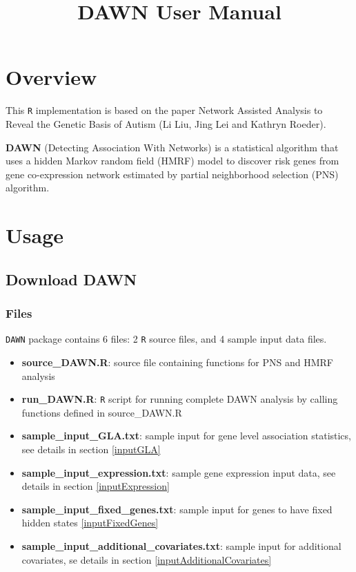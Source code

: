 \documentclass{article}
\title{ \vspace{-5mm}
        \textbf{DAWN User Manual}}
\date{}
\begin{document}
\maketitle 

\tableofcontents

\newpage
\section{Overview}
This \texttt{R} implementation is based on the paper Network Assisted Analysis to Reveal the Genetic Basis of Autism (Li Liu, Jing Lei and Kathryn Roeder)\cite{liu2015}.

\textbf{DAWN} (Detecting Association With Networks) is a statistical algorithm that uses a hidden Markov random field (HMRF) model to discover risk genes from gene co-expression network estimated by partial neighborhood selection (PNS) algorithm.


\section{Usage}
	\subsection{Download DAWN}
		\subsubsection{Files}
		\texttt{DAWN} package contains 6 files: 2 \texttt{R} source files, and 4 sample input data files.
		\begin{itemize}
			\item \textbf{source\_DAWN.R}: source file containing functions for PNS and HMRF analysis
			
			\item \textbf{run\_DAWN.R}: \texttt{R} script for running complete DAWN analysis by calling functions defined in {source\_DAWN.R}
			
			\item \textbf{sample\_input\_GLA.txt}: sample input for gene level association statistics, see details in section \ref{inputGLA}
			
			\item \textbf{sample\_input\_expression.txt}: sample gene expression input data, see details in section \ref{inputExpression}
			
			\item \textbf{sample\_input\_fixed\_genes.txt}: sample input for genes to have fixed hidden states \ref{inputFixedGenes}
			
			\item \textbf{sample\_input\_additional\_covariates.txt}: sample input for additional covariates, se details in section \ref{inputAdditionalCovariates}
		\end{itemize}
		
\end{document}

